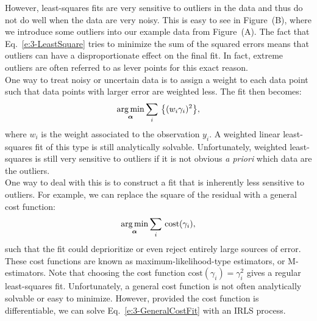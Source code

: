 However, least-squares fits are very sensitive to outliers in the data and thus do not do well when the data are very noisy.
This is easy to see in Figure~(B), where we introduce some outliers into our example data from Figure~(A).
The fact that Eq.~\ref{e:3-LeastSquare} tries to minimize the sum of the squared errors means that outliers can have a disproportionate effect on the final fit.
In fact, extreme outliers are often referred to as lever points for this exact reason.\\

One way to treat noisy or uncertain data is to assign a weight to each data point such that data points with larger error are weighted less.
The fit then becomes:
\begin{equation}
  \operatorname*{arg\,min}_{\bm{\alpha}} \sum\limits_i\,\big \{ (w_i \gamma_i)^2 \big \},
\end{equation}
where $w_i$ is the weight associated to the observation $y_i$.
A weighted linear least-squares fit of this type is still analytically solvable.
Unfortunately, weighted least-squares is still very sensitive to outliers if it is not obvious \emph{a priori} which data are the outliers. \\

One way to deal with this is to construct a fit that is inherently less sensitive to outliers.
For example, we can replace the square of the residual with a general cost function:
\begin{equation}
  \operatorname*{arg\,min}_{\bm{\alpha}} \sum\limits_i\,\textrm{cost}(\gamma_i),\label{e:3-GeneralCostFit}
\end{equation}
such that the fit could deprioritize or even reject entirely large sources of error.
These cost functions are known as maximum-likelihood-type estimators, or M-estimators.
Note that choosing the cost function $\textrm{cost}(\gamma_i) = \gamma_i^2$ gives a regular least-squares fit.
Unfortunately, a general cost function is not often analytically solvable or easy to minimize.
However, provided the cost function is differentiable, we can solve Eq.~\ref{e:3-GeneralCostFit} with an IRLS process.\\

